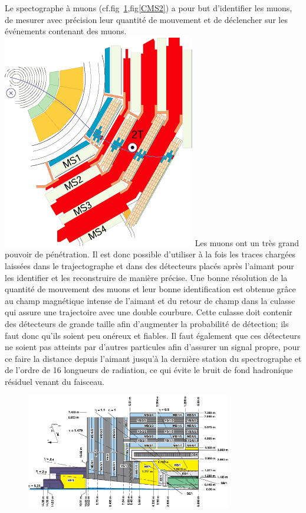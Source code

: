 Le spectographe à muons (cf.fig~\ref{CMS1},fig\ref{CMS2}) a pour but d'identifier les muons, de mesurer avec précision leur quantité de mouvement et de déclencher sur les événements contenant des muons.
\marginpar
{
	\centering
	\includegraphics[width=\marginparwidth]{CMS/MUON.png}
	\label{MUON}
} Les muons ont un très grand pouvoir de pénétration. Il est donc possible d'utiliser à la fois les traces chargées laissées dans le trajectographe et dans des détecteurs placés après l'aimant pour les identifier et les reconstruire de manière précise. Une bonne résolution de la quantité de mouvement des muons et leur bonne identification est obtenue grâce au champ magnétique intense de l'aimant et du retour de champ dans la culasse qui assure une trajectoire avec une double courbure. Cette culasse doit contenir des détecteurs de grande taille afin d'augmenter la probabilité de détection; ils faut donc qu'ils soient peu onéreux et fiables. Il faut également que ces détecteurs ne soient pas atteints par d'autres particules afin d'assurer un signal propre, pour ce faire la distance depuis l'aimant jusqu'à la dernière station du spectrographe et de l'ordre de 16 longueurs de radiation, ce qui évite le bruit de fond hadronique résiduel venant du faisceau.

\begin{figure}
\centering
\includegraphics[width=0.80\textwidth]{CMS/CMSLONG.png}
\label{CMS1}
\end{figure}


